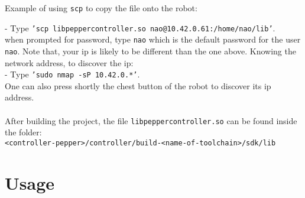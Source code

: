 \noindent Example of using \texttt{scp} to copy the file onto the robot:

- Type \texttt{'scp libpeppercontroller.so nao@10.42.0.61:/home/nao/lib'}.\\

\noindent when prompted for password, type \texttt{nao} which is the default password for the user \texttt{nao}.
Note that, your ip is likely to be different than the one above. Knowing the network address, to discover the ip:\\

- Type \texttt{'sudo nmap -sP 10.42.0.*'}.\\

\noindent One can also press shortly the chest button of the robot to discover its ip address.\\ \\
\noindent After building the project, the file
\texttt{libpeppercontroller.so} can be found inside the folder:\\
\texttt{<controller-pepper>/controller/build-<name-of-toolchain>/sdk/lib}

\section{Usage}

